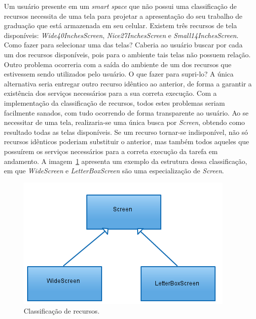 Um usuário presente em um \emph{smart space} que não possui uma classificação de recursos necessita de uma tela para projetar a apresentação do seu trabalho de graduação que está armazenada em seu celular. Existem três recursos de tela disponíveis: \emph{Wide40InchesScreen}, \emph{Nice27InchesScreen} e \emph{Small14InchesScreen}. Como fazer para selecionar uma das telas? Caberia ao usuário buscar por cada um dos recursos disponíveis, pois para o ambiente tais telas não possuem relação. Outro problema ocorreria com a saída do ambiente de um dos recursos que estivessem sendo utilizados pelo usuário. O que fazer para supri-lo? A única alternativa seria entregar outro recurso idêntico ao anterior, de forma a garantir a existência dos serviços necessários para a sua correta execução. Com a implementação da classificação de recursos, todos estes problemas seriam facilmente sanados, com tudo ocorrendo de forma transparente ao usuário. Ao se necessitar de uma tela, realizaria-se uma única busca por \emph{Screen}, obtendo como resultado todas as telas disponíveis. Se um recurso tornar-se indisponível, não só recursos idênticos poderiam substituir o anterior, mas também todos aqueles que possuírem os serviços necessários para a correta execução da tarefa em andamento. A imagem~\ref{fig:arvoreDeEquivalencia} apresenta um exemplo da estrutura dessa classificação, em que \emph{WideScreen} e \emph{LetterBoxScreen} são uma especialização de \emph{Screen}.

\begin{figure}[ht]
	\center
	\includegraphics[scale=0.8]{imagens/screenTree}
	\caption{Classificação de recursos.}
	\label{fig:arvoreDeEquivalencia}
\end{figure}

